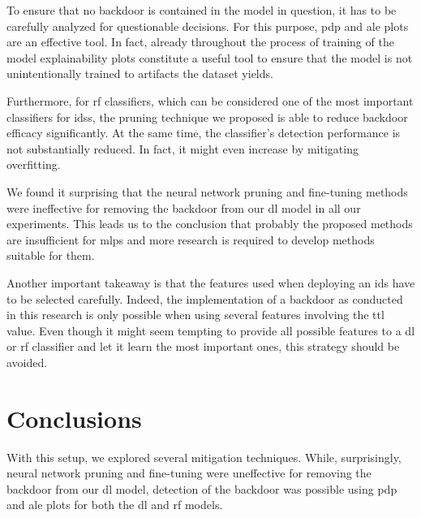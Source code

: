 \documentclass[10pt,sigconf,letterpaper,dvipsnames]{acmart}
\begin{document}
To ensure that no backdoor is contained in the model in question, it has to be carefully analyzed for questionable decisions. For this purpose, \gls{pdp} and \gls{ale} plots are an effective tool. In fact, already throughout the process of training of the model explainability plots constitute a useful tool to ensure that the model is not unintentionally trained  to artifacts the dataset yields.

Furthermore, for \gls{rf} classifiers, which can be considered one of the most important classifiers for \glspl{ids}, the pruning technique we proposed is able to reduce backdoor efficacy significantly. At the same time, the classifier's detection performance is not substantially reduced. In fact, it might even increase by mitigating overfitting.

We found it surprising that the neural network pruning and fine-tuning methods were ineffective for removing the backdoor from our \gls{dl} model in all our experiments. This leads us to the conclusion that probably the proposed methods are insufficient for \glspl{mlp} and more research is required to develop methods suitable for them.

Another important takeaway is that the features used when deploying an \gls{ids} have to be selected carefully. Indeed, the implementation of a backdoor as conducted in this research is only possible when using several features involving the \gls{ttl} value. Even though it might seem tempting to provide all possible features to a \gls{dl} or \gls{rf} classifier and let it learn the most important ones, this strategy should be avoided.

\section{Conclusions}

With this setup, we explored several mitigation techniques. While, surprisingly, neural network pruning and fine-tuning were uneffective for removing the backdoor from our \gls{dl} model, detection of the backdoor was possible using \gls{pdp} and \gls{ale} plots  for both the \gls{dl} and \gls{rf} models.

\end{document}
